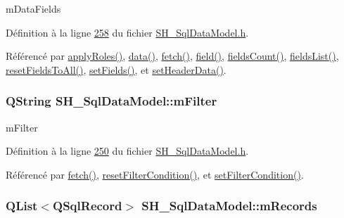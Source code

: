 m\-Data\-Fields 



Définition à la ligne \hyperlink{SH__SqlDataModel_8h_source_l00258}{258} du fichier \hyperlink{SH__SqlDataModel_8h_source}{S\-H\-\_\-\-Sql\-Data\-Model.\-h}.



Référencé par \hyperlink{classSH__SqlDataModel_ad4f032ceb7c2f70b2d7388e3afd161ab}{apply\-Roles()}, \hyperlink{classSH__SqlDataModel_aa4664329d52c2d2cba2bacc42fa1a564}{data()}, \hyperlink{classSH__SqlDataModel_ab6c206088250a66ddc8cb8d33a38e421}{fetch()}, \hyperlink{classSH__SqlDataModel_a92c51d5c1f6aca08a7ee566ece1e4cb6}{field()}, \hyperlink{classSH__SqlDataModel_a46f0951fd358e30892a982ebd34e43c2}{fields\-Count()}, \hyperlink{classSH__SqlDataModel_a571bdc1f9592bd13f98fd748563d46c0}{fields\-List()}, \hyperlink{classSH__SqlDataModel_ad0477d16e78ba808250e2054952f9833}{reset\-Fields\-To\-All()}, \hyperlink{classSH__SqlDataModel_ad297d359375d55e66493ce8935f8ff05}{set\-Fields()}, et \hyperlink{classSH__SqlDataModel_aae31b72ec89a35a7b8d4175d7bcaa33a}{set\-Header\-Data()}.

\hypertarget{classSH__SqlDataModel_af83c15ae3ad1dc4617dd58f2a852a1e2}{
\subsubsection[{m\-Filter}]{\setlength{\rightskip}{0pt plus 5cm}Q\-String S\-H\-\_\-\-Sql\-Data\-Model\-::m\-Filter\hspace{0.3cm}{\ttfamily [private]}}}\label{classSH__SqlDataModel_af83c15ae3ad1dc4617dd58f2a852a1e2}


m\-Filter 



Définition à la ligne \hyperlink{SH__SqlDataModel_8h_source_l00250}{250} du fichier \hyperlink{SH__SqlDataModel_8h_source}{S\-H\-\_\-\-Sql\-Data\-Model.\-h}.



Référencé par \hyperlink{classSH__SqlDataModel_ab6c206088250a66ddc8cb8d33a38e421}{fetch()}, \hyperlink{classSH__SqlDataModel_a0bf147a87376fc3aa436562f94661679}{reset\-Filter\-Condition()}, et \hyperlink{classSH__SqlDataModel_a99c6317027a7c9f723215b53b69e0647}{set\-Filter\-Condition()}.

\hypertarget{classSH__SqlDataModel_aa58096989daac3cd3fdea5e6dd4f27ee}{
\subsubsection[{m\-Records}]{\setlength{\rightskip}{0pt plus 5cm}Q\-List$<$Q\-Sql\-Record$>$ S\-H\-\_\-\-Sql\-Data\-Model\-::m\-Records\hspace{0.3cm}{\ttfamily [private]}}}\label{classSH__SqlDataModel_aa58096989daac3cd3fdea5e6dd4f27ee}


